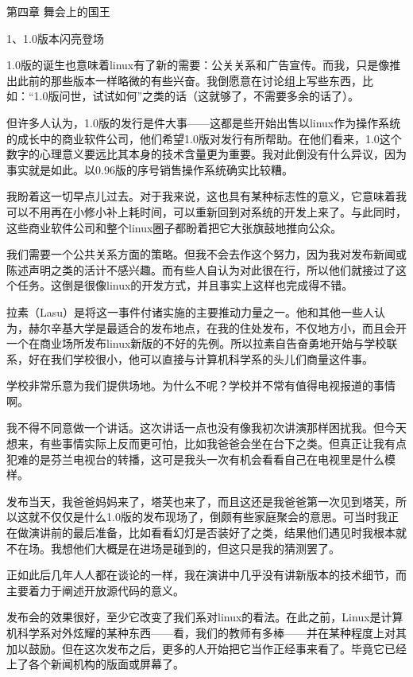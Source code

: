 第四章 舞会上的国王

 
1、1.0版本闪亮登场

1.0版的诞生也意味着linux有了新的需要：公关关系和广告宣传。而我，只是像推出此前的那些版本一样略微的有些兴奋。我倒愿意在讨论组上写些东西，比如：“1.0版问世，试试如何”之类的话（这就够了，不需要多余的话了）。

但许多人认为，1.0版的发行是件大事——这都是些开始出售以linux作为操作系统的成长中的商业软件公司，他们希望1.0版对发行有所帮助。在他们看来，1.0这个数字的心理意义要远比其本身的技术含量更为重要。我对此倒没有什么异议，因为事实就是如此。以0.96版的序号销售操作系统确实比较糟。

我盼着这一切早点儿过去。对于我来说，这也具有某种标志性的意义，它意味着我可以不用再在小修小补上耗时间，可以重新回到对系统的开发上来了。与此同时，这些商业软件公司和整个linux圈子都盼着把它大张旗鼓地推向公众。

我们需要一个公共关系方面的策略。但我不会去作这个努力，因为我对发布新闻或陈述声明之类的活计不感兴趣。而有些人自认为对此很在行，所以他们就接过了这个任务。这倒是很像linux的开发方式，并且事实上这样也完成得不错。

拉素（Lasu）是将这一事件付诸实施的主要推动力量之一。他和其他一些人认为，赫尔辛基大学是最适合的发布地点，在我的住处发布，不仅地方小，而且会开一个在商业场所发布linux新版的不好的先例。所以拉素自告奋勇地开始与学校联系，好在我们学校很小，他可以直接与计算机科学系的头儿们商量这件事。

学校非常乐意为我们提供场地。为什么不呢？学校并不常有值得电视报道的事情啊。

我不得不同意做一个讲话。这次讲话一点也没有像我初次讲演那样困扰我。但今天想来，有些事情实际上反而更可怕，比如我爸爸会坐在台下之类。但真正让我有点犯难的是芬兰电视台的转播，这可是我头一次有机会看看自己在电视里是什么模样。

发布当天，我爸爸妈妈来了，塔芙也来了，而且这还是我爸爸第一次见到塔芙，所以这就不仅仅是什么1.0版的发布现场了，倒颇有些家庭聚会的意思。可当时我正在做演讲前的最后准备，比如看看幻灯是否装好了之类，结果他们遇见时我根本就不在场。我想他们大概是在进场是碰到的，但这只是我的猜测罢了。

正如此后几年人人都在谈论的一样，我在演讲中几乎没有讲新版本的技术细节，而主要着力于阐述开放源代码的意义。

发布会的效果很好，至少它改变了我们系对linux的看法。在此之前，Linux是计算机科学系对外炫耀的某种东西——看，我们的教师有多棒——并在某种程度上对其加以鼓励。但在这次发布之后，更多的人开始把它当作正经事来看了。毕竟它已经上了各个新闻机构的版面或屏幕了。

